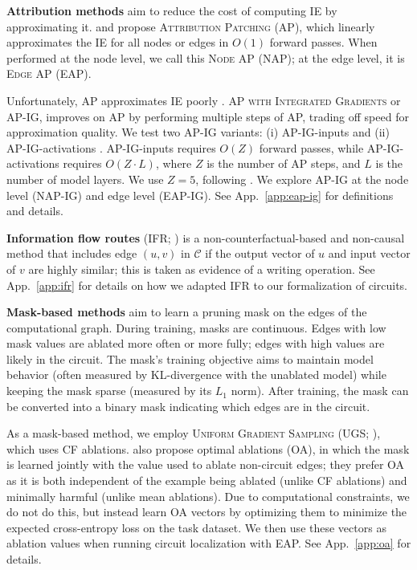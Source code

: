 \documentclass{article}
\theoremstyle{plain}
\theoremstyle{definition}
\theoremstyle{remark}
\begin{document}
\textbf{Attribution methods} aim to reduce the cost of computing IE by approximating it. \citet{nanda2023attribution} and \citet{syed-etal-2024-attribution} propose \textsc{Attribution Patching} (AP), which linearly approximates the IE for all nodes or edges in $O(1)$ forward passes. When performed at the node level, we call this \textsc{Node AP} (NAP); at the edge level, it is \textsc{Edge AP} (EAP). 

Unfortunately, AP approximates IE poorly \citep{syed-etal-2024-attribution}. 
\textsc{AP with Integrated Gradients} \citep{sundararajan2017ig} or AP-IG, improves on AP by performing multiple steps of AP, trading off speed for approximation quality. We test two AP-IG variants: (i) AP-IG-inputs \citep{hanna2024have} and (ii) AP-IG-activations \citep{marks2024sparsefeaturecircuitsdiscovering}. AP-IG-inputs requires $O(Z)$ forward passes, while AP-IG-activations requires $O(Z \cdot L)$, where $Z$ is the number of AP steps, and $L$ is the number of model layers. We use $Z=5$, following \citet{hanna2024have}. We explore AP-IG at the node level (NAP-IG) and edge level (EAP-IG). See App.~\ref{app:eap-ig} for definitions and details.


\textbf{Information flow routes} (IFR; \citealp{ferrando-voita-2024-information}) is a non-counterfactual-based and non-causal method that includes edge $(u,v)$ in $\mathcal{C}$ if the output vector of $u$ and input vector of $v$ are highly similar; this is taken as evidence of a writing operation. See App.~\ref{app:ifr} for details on how we adapted IFR to our formalization of circuits.

\textbf{Mask-based methods} aim to learn a pruning mask on the edges of the computational graph. During training, masks are continuous. Edges with low mask values are ablated more often or more fully; edges with high values are likely in the circuit. The mask's training objective aims to maintain model behavior (often measured by KL-divergence with the unablated model) while keeping the mask sparse (measured by its $L_1$ norm). After training, the mask can be converted into a binary mask indicating which edges are in the circuit.

As a mask-based method, we employ \textsc{Uniform Gradient Sampling} (UGS; \citealp{li2024optimal}), which uses CF ablations. \citeauthor{li2024optimal} also propose optimal ablations (OA), in which the mask is learned jointly with the value used to ablate non-circuit edges; they prefer OA as it is both independent of the example being ablated (unlike CF ablations) and minimally harmful (unlike mean ablations). Due to computational constraints, we do not do this, but instead learn OA vectors by optimizing them to minimize the expected cross-entropy loss on the task dataset. We then use these vectors as ablation values when running circuit localization with EAP. See App.~\ref{app:oa} for details.
\end{document}
